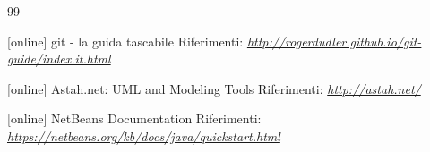 \begin {frame} [allowframebreaks]
\begin {thebibliography}{99}
{     [online]
      git - la guida tascabile 
     \newblock Riferimenti: \emph{\url{http://rogerdudler.github.io/git-guide/index.it.html }}

     [online]
      Astah.net: UML and Modeling Tools
     \newblock Riferimenti: \emph{\url{http://astah.net/ }}

     [online]
      NetBeans Documentation
     \newblock Riferimenti: \emph{\url{https://netbeans.org/kb/docs/java/quickstart.html }}

   }
   \end {thebibliography}
\end{frame}
